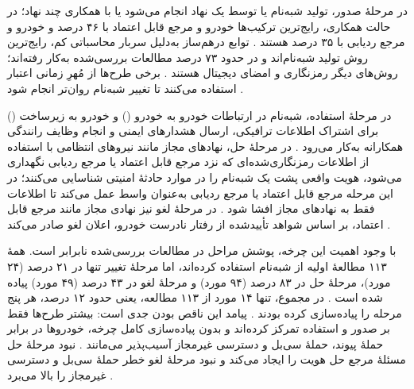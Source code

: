 \documentclass[12pt,a4paper]{article}
\begin{document}
در مرحلهٔ صدور، تولید شبه‌نام یا توسط یک نهاد انجام می‌شود یا با همکاری چند نهاد؛ در حالت همکاری، رایج‌ترین ترکیب‌ها خودرو و مرجع قابل اعتماد با ۴۶ درصد و خودرو و مرجع ردیابی با ۳۵ درصد هستند \cite{rahmawatiagustinaSystematicLiteratureReview2025}. توابع درهم‌ساز به‌دلیل سربار محاسباتی کم، رایج‌ترین روش تولید شبه‌نام‌اند و در حدود ۷۳ درصد مطالعات بررسی‌شده به‌کار رفته‌اند؛ روش‌های دیگر رمزنگاری و امضای دیجیتال هستند \cite{rahmawatiagustinaSystematicLiteratureReview2025}. برخی طرح‌ها از مُهرِ زمانی اعتبار استفاده می‌کنند تا تغییر شبه‌نام روان‌تر انجام شود \cite{rahmawatiagustinaSystematicLiteratureReview2025}.

در مرحلهٔ استفاده، شبه‌نام در ارتباطات خودرو به خودرو () و خودرو به زیرساخت () برای اشتراک اطلاعات ترافیکی، ارسال هشدار‌های ایمنی و انجام وظایف رانندگی همکارانه به‌کار می‌رود \cite{rahmawatiagustinaSystematicLiteratureReview2025}. در مرحلهٔ حل، نهاد‌های مجاز مانند نیرو‌های انتظامی با استفاده از اطلاعات رمزنگاری‌شده‌ای که نزد مرجع قابل اعتماد یا مرجع ردیابی نگهداری می‌شود، هویت واقعی پشت یک شبه‌نام را در موارد حادثهٔ امنیتی شناسایی می‌کنند؛ در این مرحله مرجع قابل اعتماد یا مرجع ردیابی به‌عنوان واسط عمل می‌کند تا اطلاعات فقط به نهاد‌های مجاز افشا شود \cite{rahmawatiagustinaSystematicLiteratureReview2025}. در مرحلهٔ لغو نیز نهادی مجاز مانند مرجع قابل اعتماد، بر اساس شواهد تأییدشده از رفتار نادرست خودرو، اعلان لغو صادر می‌کند \cite{rahmawatiagustinaSystematicLiteratureReview2025}.

با وجود اهمیت این چرخه، پوشش مراحل در مطالعات بررسی‌شده نابرابر است. همهٔ ۱۱۳ مطالعهٔ اولیه از شبه‌نام استفاده کرده‌اند، اما مرحلهٔ تغییر تنها در ۲۱ درصد (۲۴ مورد)، مرحلهٔ حل در ۸۳ درصد (۹۴ مورد) و مرحلهٔ لغو در ۴۳ درصد (۴۹ مورد) پیاده شده است \cite{rahmawatiagustinaSystematicLiteratureReview2025}. در مجموع، تنها ۱۴ مورد از ۱۱۳ مطالعه، یعنی حدود ۱۲ درصد، هر پنج مرحله را پیاده‌سازی کرده بودند \cite{rahmawatiagustinaSystematicLiteratureReview2025}. پیامد این ناقص بودن جدی است: بیشتر طرح‌ها فقط بر صدور و استفاده تمرکز کرده‌اند و بدون پیاده‌سازی کامل چرخه، خودرو‌ها در برابر حملهٔ پیوند، حملهٔ سی‌بل و دسترسی غیرمجاز آسیب‌پذیر می‌مانند \cite{rahmawatiagustinaSystematicLiteratureReview2025}. نبود مرحلهٔ حل مسئلهٔ مرجع حل هویت را ایجاد می‌کند و نبود مرحلهٔ لغو خطر حملهٔ سی‌بل و دسترسی غیرمجاز را بالا می‌برد \cite{rahmawatiagustinaSystematicLiteratureReview2025}.
\end{document}

